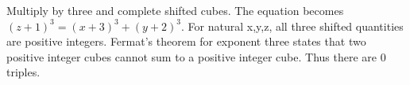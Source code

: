 Multiply by three and complete shifted cubes. The equation becomes $(z+1)^3=(x+3)^3+(y+2)^3$. For natural x,y,z, all three shifted quantities are positive integers. Fermat's theorem for exponent three states that two positive integer cubes cannot sum to a positive integer cube. Thus there are $\boxed0$ triples.
